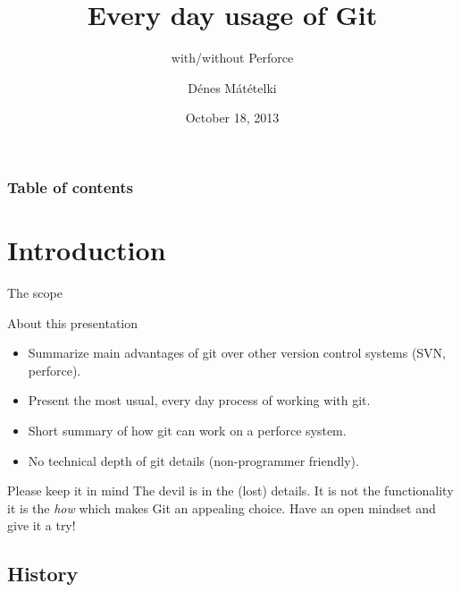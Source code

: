 \documentclass{beamer}
\title {Every day usage of Git}
\subtitle{with/without Perforce}
\author{Dénes Mátételki}
\institute{www.emerson.com}
\date{October 18, 2013}
\begin{document}

\begin{frame}
\titlepage
\end{frame}


\begin{frame}
\frametitle{Table of contents}
\tableofcontents
\end{frame}



\section{Introduction}

\begin{frame}{The scope}

\begin{block}{About this presentation}
\begin{itemize}
 \item Summarize main advantages of git over other version control systems (SVN, perforce).
 \item Present the most usual, every day process of working with git.
 \item Short summary of how git can work on a perforce system.
 \item No technical depth of git details (non-programmer friendly).
\end{itemize}
\end{block}

\begin{exampleblock}{Please keep it in mind}
The devil is in the (lost) details. It is not the functionality it is the \textit{how} which makes Git an appealing choice. Have an open mindset and give it a try!
\end{exampleblock}


\end{frame}


\subsection{History}
\end{document}
